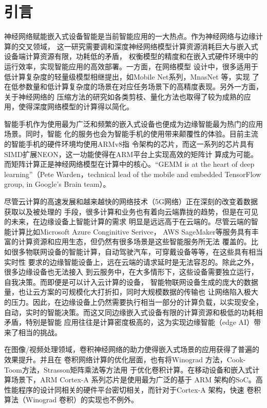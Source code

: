 
\chapter{引言}
\label{cha:intro}

神经网络赋能嵌入式设备智能是当前智能应用的一大热点。作为神经网络与边缘计算的交叉领域，
这一研究需要调和深度神经网络模型计算资源消耗巨大与嵌入式设备端计算资源有限，功耗低的矛盾，
权衡模型的精度和在嵌入式硬件环境中的运行效率，实现智能应用的高效部署。一方面，在网络模型
设计中，很多适用于低计算复杂度的轻量级模型相继提出，如Mobile Net系列，MnasNet 等，实现
了在低参数量和低计算复杂度的场景在对应任务场景下的高精度表现。另外一方面，关于神经网络的
压缩方法的研究如各类剪枝、量化方法也取得了较为成熟的应用，使得深度网络模型的计算得以简化。


智能手机作为使用最为广泛和频繁的嵌入式设备也便成为边缘智能最为热门的应用场景。同时，智能
化的服务也会为智能手机的使用带来颠覆性的体验。目前主流的智能手机的硬件环境均使用ARMv8指
令架构的芯片，而这一系列的芯片具有SIMD扩展NEON，这一功能使得在ARM平台上实现高效的矩阵计
算成为可能。而矩阵计算正是神经网络模型在计算中的核心。“GEMM is at the heart of deep
 learning”（Pete Warden，technical lead of the mobile and embedded TensorFlow 
 group, in Google's Brain team）。

尽管云计算的高速发展和越来越快的网络技术（5G网络）正在深刻的改变着数据获取以及被处理的
手段，很多计算和业务也有着向云端靠拢的趋势，但是在可见的未来，在边缘设备上智能计算的需求
明显是远远高于在云端的。尽管云端的智能计算比如Microsoft Azure Conginitive Serivce，
AWS SageMaker等服务具有丰富的计算资源和应用生态，但仍然有很多场景是这些智能服务所无法
覆盖的。比如很多物联网设备的智能计算，自动驾驶汽车，可穿戴设备等等，在这些具有相当实时性
要求的边缘智能设备上，远在云端的请求延时是无法容忍的。除此之外，很多边缘设备也无法接入
到云服务中，在大多情形下，这些设备需要独立运行，自我决策。而即便是可以计入云计算的设备，
智能物联网设备生成的庞大的数据量，也让云方案的可规模化大打折扣，同时大规模数据的传输也
让网络陷入极大的压力。因此，在边缘设备上仍然需要执行相当一部分的计算负载，以实现安全，
自动，实时的智能决策。而这又同边缘嵌入式设备有限的计算资源和极低的功耗相矛盾，特别是智能
应用往往是计算密度极高的，这为实现边缘智能（edge AI）带来了相当的挑战。

在图像/视频处理领域，卷积神经网络的助力使得嵌入式场景的应用获得了普遍的效果提升。并且在
卷积网络计算的优化层面，也有将Winograd 方法，Cook-Toom方法，Strasson矩阵乘法等方法用
于优化卷积计算。在移动设备和嵌入式计算场景下，ARM Cortex-A 系列芯片是使用最为广泛的基于
ARM  架构的SoC。高性能程序的设计同相关的硬件平台密切相关，而针对于Cortex-A 架构，快速
卷积算法（Winograd 卷积）的实现也不例外。

